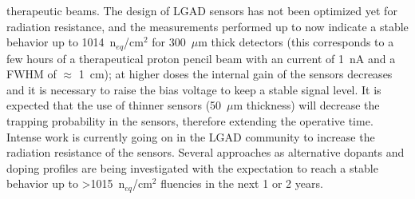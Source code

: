 therapeutic beams. The design of LGAD sensors has not been optimized yet for radiation
resistance, and the measurements performed up to now indicate a stable behavior up to 1014~n$_{eq}$/cm$^2$ for 300~$\mu$m thick detectors (this corresponds to a few hours of a therapeutical proton
pencil beam with an current of 1~nA and a FWHM of $\approx$ 1~cm); at higher doses the internal gain
of the sensors decreases and it is necessary to raise the bias voltage to keep a stable signal level.
It is expected that the use of thinner sensors (50~$\mu$m thickness) will decrease the trapping
probability in the sensors, therefore extending the operative time. Intense work is currently going
on in the LGAD community to increase the radiation resistance of the sensors. Several
approaches as alternative dopants and doping profiles are being investigated with the expectation
to reach a stable behavior up to >1015~n$_{eq}$/cm$^2$ fluencies in the next 1 or 2 years.



